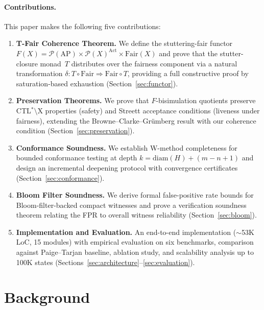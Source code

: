 \documentclass[11pt]{article}
\newcommand{\Pow}{\mathcal{P}}
\newcommand{\Fair}{\ensuremath{\mathrm{Fair}}}
\newcommand{\Act}{\ensuremath{\mathrm{Act}}}
\newcommand{\AP}{\ensuremath{\mathrm{AP}}}
\newcommand{\diam}{\ensuremath{\mathrm{diam}}}
\begin{document}
\paragraph{Contributions.}
This paper makes the following five contributions:
\begin{enumerate}[nosep]
\item \textbf{T-Fair Coherence Theorem.}
  We define the stuttering-fair functor
  $F(X) = \Pow(\AP) \times \Pow(X)^{\Act} \times \Fair(X)$
  and prove that the stutter-closure monad~$T$ distributes over the fairness
  component via a natural transformation
  $\delta : T \circ \Fair \Rightarrow \Fair \circ T$,
  providing a full constructive proof by saturation-based exhaustion
  (Section~\ref{sec:functor}).

\item \textbf{Preservation Theorems.}
  We prove that $F$-bisimulation quotients preserve CTL$^*$$\setminus$X
  properties (safety) and Streett acceptance conditions (liveness under
  fairness), extending the Browne--Clarke--Gr\"umberg result with our
  coherence condition (Section~\ref{sec:preservation}).

\item \textbf{Conformance Soundness.}
  We establish W-method completeness for bounded conformance testing at
  depth $k = \diam(H) + (m - n + 1)$ and design an incremental deepening
  protocol with convergence certificates
  (Section~\ref{sec:conformance}).

\item \textbf{Bloom Filter Soundness.}
  We derive formal false-positive rate bounds for Bloom-filter-backed
  compact witnesses and prove a verification soundness theorem relating
  the FPR to overall witness reliability
  (Section~\ref{sec:bloom}).

\item \textbf{Implementation and Evaluation.}
  An end-to-end implementation (${\sim}$53K LoC, 15 modules) with empirical
  evaluation on six benchmarks, comparison against Paige--Tarjan baseline,
  ablation study, and scalability analysis up to 100K states
  (Sections~\ref{sec:architecture}--\ref{sec:evaluation}).
\end{enumerate}

\section{Background}
\label{sec:background}
\end{document}
